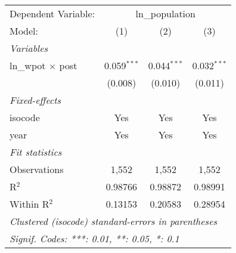 
\begingroup
\centering
\begin{tabular}{lccc}
   \tabularnewline \midrule \midrule
   Dependent Variable: & \multicolumn{3}{c}{ln\_population}\\
   Model:                   & (1)           & (2)           & (3)\\  
   \midrule
   \emph{Variables}\\
   ln\_wpot $\times$ post   & 0.059$^{***}$ & 0.044$^{***}$ & 0.032$^{***}$\\   
                            & (0.008)       & (0.010)       & (0.011)\\   
   \midrule
   \emph{Fixed-effects}\\
   isocode                  & Yes           & Yes           & Yes\\  
   year                     & Yes           & Yes           & Yes\\  
   \midrule
   \emph{Fit statistics}\\
   Observations             & 1,552         & 1,552         & 1,552\\  
   R$^2$                    & 0.98766       & 0.98872       & 0.98991\\  
   Within R$^2$             & 0.13153       & 0.20583       & 0.28954\\  
   \midrule \midrule
   \multicolumn{4}{l}{\emph{Clustered (isocode) standard-errors in parentheses}}\\
   \multicolumn{4}{l}{\emph{Signif. Codes: ***: 0.01, **: 0.05, *: 0.1}}\\
\end{tabular}
\par\endgroup


